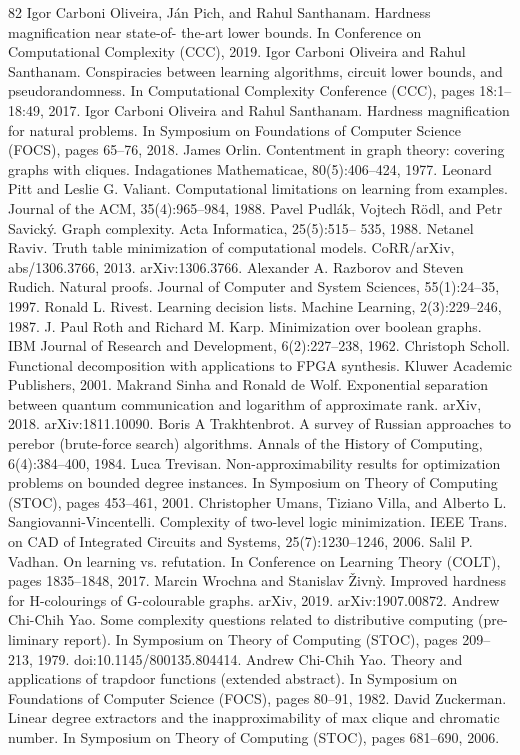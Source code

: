 \begin{thebibliography}{82}
Igor Carboni Oliveira, Ján Pich, and Rahul Santhanam. Hardness magnification near state-of- the-art lower bounds. In Conference on Computational Complexity (CCC), 2019.
Igor Carboni Oliveira and Rahul Santhanam. Conspiracies between learning algorithms, circuit lower bounds, and pseudorandomness. In Computational Complexity Conference (CCC), pages 18:1–18:49, 2017.
Igor Carboni Oliveira and Rahul Santhanam. Hardness magnification for natural problems. In Symposium on Foundations of Computer Science (FOCS), pages 65–76, 2018.
James Orlin. Contentment in graph theory: covering graphs with cliques. Indagationes Mathematicae, 80(5):406–424, 1977.
Leonard Pitt and Leslie G. Valiant. Computational limitations on learning from examples. Journal of the ACM, 35(4):965–984, 1988.
Pavel Pudlák, Vojtech Rödl, and Petr Savický. Graph complexity. Acta Informatica, 25(5):515– 535, 1988.
Netanel Raviv.     Truth table minimization of computational models.           CoRR/arXiv, abs/1306.3766, 2013. arXiv:1306.3766.
Alexander A. Razborov and Steven Rudich. Natural proofs. Journal of Computer and System Sciences, 55(1):24–35, 1997.
Ronald L. Rivest. Learning decision lists. Machine Learning, 2(3):229–246, 1987.
J. Paul Roth and Richard M. Karp. Minimization over boolean graphs. IBM Journal of Research and Development, 6(2):227–238, 1962.
Christoph Scholl. Functional decomposition with applications to FPGA synthesis. Kluwer Academic Publishers, 2001.
Makrand Sinha and Ronald de Wolf. Exponential separation between quantum communication and logarithm of approximate rank. arXiv, 2018. arXiv:1811.10090.
Boris A Trakhtenbrot. A survey of Russian approaches to perebor (brute-force search) algorithms. Annals of the History of Computing, 6(4):384–400, 1984.
Luca Trevisan. Non-approximability results for optimization problems on bounded degree instances. In Symposium on Theory of Computing (STOC), pages 453–461, 2001.
Christopher Umans, Tiziano Villa, and Alberto L. Sangiovanni-Vincentelli. Complexity of two-level logic minimization. IEEE Trans. on CAD of Integrated Circuits and Systems, 25(7):1230–1246, 2006.
Salil P. Vadhan. On learning vs. refutation. In Conference on Learning Theory (COLT), pages 1835–1848, 2017.
Marcin Wrochna and Stanislav Živnỳ. Improved hardness for H-colourings of G-colourable graphs. arXiv, 2019. arXiv:1907.00872.
Andrew Chi-Chih Yao. Some complexity questions related to distributive computing (pre- liminary report). In Symposium on Theory of Computing (STOC), pages 209–213, 1979. doi:10.1145/800135.804414.
Andrew Chi-Chih Yao. Theory and applications of trapdoor functions (extended abstract). In Symposium on Foundations of Computer Science (FOCS), pages 80–91, 1982.
David Zuckerman. Linear degree extractors and the inapproximability of max clique and chromatic number. In Symposium on Theory of Computing (STOC), pages 681–690, 2006.
\end{thebibliography}
